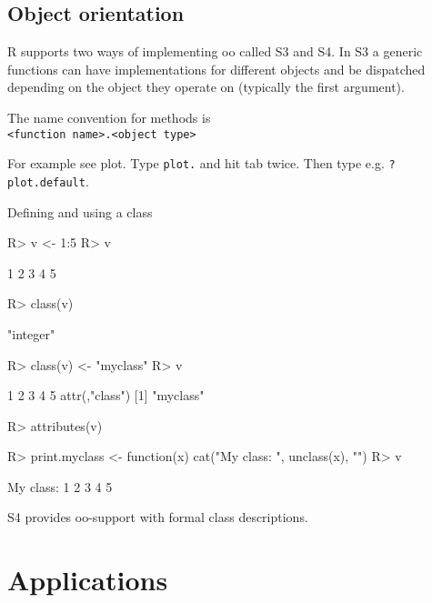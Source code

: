 \documentclass[fleqn, letter, 10pt]{article}
\begin{document}
\subsection{Object orientation}

R supports two ways of implementing oo called S3 and S4. In S3 a generic
functions can have implementations for different objects and be dispatched
depending on the object they operate on (typically the first argument).  

The name convention for methods is\\
\verb|<function name>.<object type>|

For example see plot. Type \verb|plot.| and hit tab twice. Then type e.g. 
\verb|? plot.default|.

Defining and using a class
\begin{Schunk}
\begin{Sinput}
R> v <- 1:5
R> v
\end{Sinput}
\begin{Soutput}
[1] 1 2 3 4 5
\end{Soutput}
\begin{Sinput}
R> class(v)
\end{Sinput}
\begin{Soutput}
[1] "integer"
\end{Soutput}
\begin{Sinput}
R> class(v) <- "myclass"
R> v
\end{Sinput}
\begin{Soutput}
[1] 1 2 3 4 5
attr(,"class")
[1] "myclass"
\end{Soutput}
\begin{Sinput}
R> attributes(v)
\end{Sinput}
\begin{Sinput}
R> print.myclass <- function(x) {cat("My class: ", unclass(x), "\n")}
R> v
\end{Sinput}
\begin{Soutput}
My class:  1 2 3 4 5 
\end{Soutput}
\end{Schunk}

S4 provides oo-support with formal class descriptions.

\section{Applications}
\end{document}
